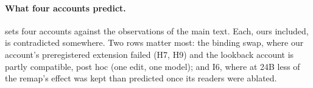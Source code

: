\paragraph{What four accounts predict.}
 sets four accounts against the observations of the main text. Each, ours included, is contradicted somewhere. Two rows matter most: the binding swap, where our account's preregistered extension failed (H7, H9) and the lookback account is partly compatible, post hoc (one edit, one model); and I6, where at 24B less of the remap's effect was kept than predicted once its readers were ablated.

\begin{table}[!ht]
  \centering
  \caption{\textbf{What four accounts predict.} DT: duplicate-token attention alone; LB: lookback addresses and payloads \citep{prakash2025lookbacks,wu2026record}; FF: an edit's channel is set by the format it was fit in; LM: later-mention readers (ours). $\checkmark$: predicted and observed; $\times$: predicted otherwise (refuted); --: silent; (ph): compatible, post hoc; $\checkmark$/$\times$: the attention is predicted, its presence without a read is not; $\checkmark$/(ph): the attention is predicted, its presence without a read is explained post hoc (the read is decided downstream). Binding-swap row: \cref{sec:prakash}; last two rows: \cref{sec:link}.}
  \label{tab:accounts}
  {\small}
\end{table}


